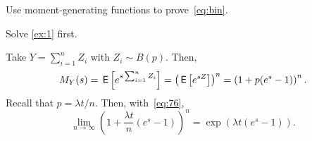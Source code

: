 \documentclass[stochastic-or.tex]{subfiles}
\begin{document}
\begin{exercise}
\begin{solution}
\end{solution}
\end{exercise}


\begin{exercise} \label{ex:96}
 Use moment-generating functions to prove~\cref{eq:bin}.
\begin{hint}
Solve \cref{ex:1} first.
\end{hint}
\begin{solution}
Take $Y=\sum_{i=1}^n Z_i$ with $Z_i\sim B(p)$. Then,
\begin{equation*}
M_Y(s) = \,\mathsf{E}\left[e^{s\sum_{i=1}^n Z_i}\right] = \left(\,\mathsf{E}\left[e^{s Z}\right]\right)^n = \left(1 + p (e^s - 1)\right)^n.
\end{equation*}
Recall that $p= \lambda t/ n$. Then, with~\cref{eq:76},
\begin{equation*}
\lim_{n\to\infty} \left(1 + \frac{\lambda t}{n} (e^s - 1)\right)^n = \exp({\lambda t (e^s-1)}).
\end{equation*}
\end{solution}
\end{exercise}
\end{document}
